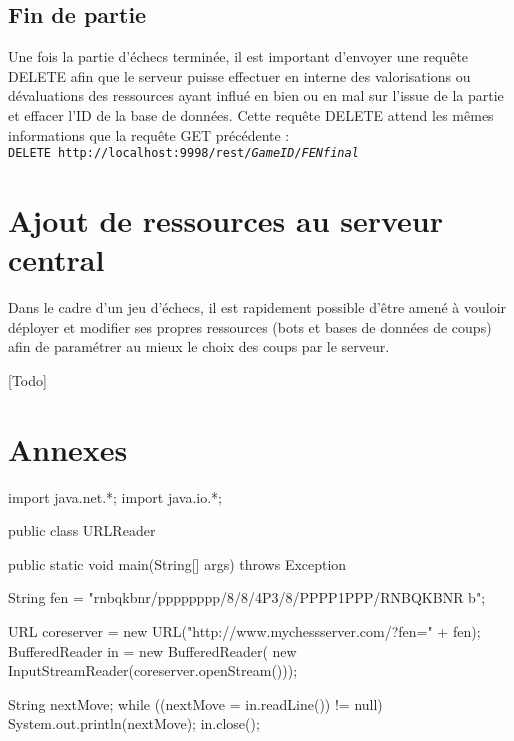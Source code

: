 \documentclass[a4paper,11pt]{article}
\begin{document}
\subsection{Fin de partie}
        Une fois la partie d’échecs terminée, il est important d’envoyer une requête DELETE afin que le serveur puisse effectuer en interne des valorisations ou dévaluations des ressources ayant influé en bien ou en mal sur l’issue de la partie et effacer l’ID de la base de données. Cette requête DELETE attend les mêmes informations que la requête GET précédente : 
\\{\tt DELETE http://localhost:9998/rest/{\em GameID}/{\em FENfinal}}


\section{Ajout de ressources au serveur central}
         Dans le cadre d'un jeu d'échecs, il est rapidement possible d’être amené à vouloir déployer et modifier ses propres ressources (bots et bases de données de coups) afin de paramétrer au mieux le choix des coups par le serveur.
        
         [Todo]
        
        
        
\section{Annexes}

\begin{java}[{Java}]
import java.net.*;
import java.io.*;

public class URLReader {
    public static void main(String[] args) throws Exception {
		String fen = "rnbqkbnr/pppppppp/8/8/4P3/8/PPPP1PPP/RNBQKBNR b";
		
        URL coreserver = new URL("http://www.mychessserver.com/?fen=" + fen);
        BufferedReader in = new BufferedReader(
        new InputStreamReader(coreserver.openStream()));

        String nextMove;
        while ((nextMove = in.readLine()) != null)
            System.out.println(nextMove);
        in.close();
    }
}
\end{java}
\end{document}
